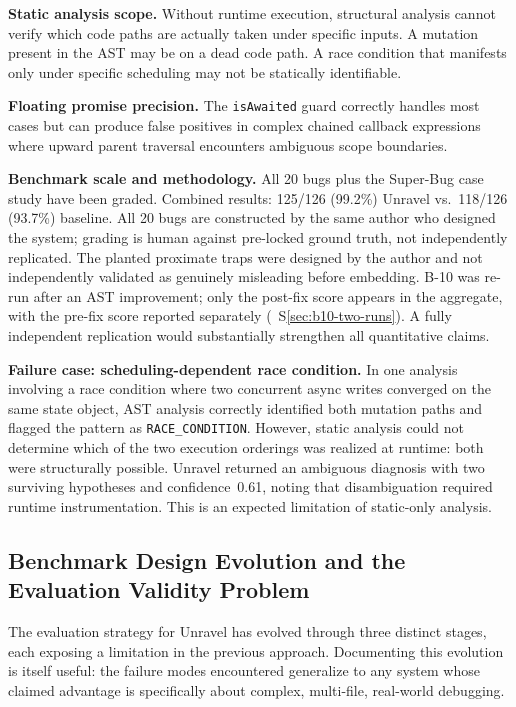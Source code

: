 \documentclass[12pt,a4paper]{article}
\newcommand{\code}[1]{\texttt{\small #1}}
\begin{document}
\textbf{Static analysis scope.} Without runtime execution, structural analysis cannot
verify which code paths are actually taken under specific inputs. A mutation present in
the AST may be on a dead code path. A race condition that manifests only under specific
scheduling may not be statically identifiable.

\textbf{Floating promise precision.} The \code{isAwaited} guard correctly handles most
cases but can produce false positives in complex chained callback expressions where upward
parent traversal encounters ambiguous scope boundaries.

\textbf{Benchmark scale and methodology.} All 20 bugs plus the Super-Bug case study have been graded.
Combined results: 125/126 (99.2\%) Unravel vs.~118/126 (93.7\%) baseline.
All 20 bugs are constructed by the same author who designed the system; grading
is human against pre-locked ground truth, not independently replicated. The planted
proximate traps were designed by the author and not independently validated as
genuinely misleading before embedding. B-10 was re-run after an AST improvement;
only the post-fix score appears in the aggregate, with the pre-fix score reported
separately (\ S\ref{sec:b10-two-runs}). A fully independent replication would
substantially strengthen all quantitative claims.

\textbf{Failure case: scheduling-dependent race condition.} In one analysis involving a
race condition where two concurrent async writes converged on the same state object, AST
analysis correctly identified both mutation paths and flagged the pattern as
\code{RACE\_CONDITION}. However, static analysis could not determine which of the two
execution orderings was realized at runtime: both were structurally possible. Unravel
returned an ambiguous diagnosis with two surviving hypotheses and confidence~0.61, noting
that disambiguation required runtime instrumentation. This is an expected limitation of
static-only analysis.

\subsection{Benchmark Design Evolution and the Evaluation Validity Problem}
\label{sec:eval-evolution}

The evaluation strategy for Unravel has evolved through three distinct stages, each
exposing a limitation in the previous approach. Documenting this evolution is itself
useful: the failure modes encountered generalize to any system whose claimed advantage
is specifically about complex, multi-file, real-world debugging.
\end{document}
